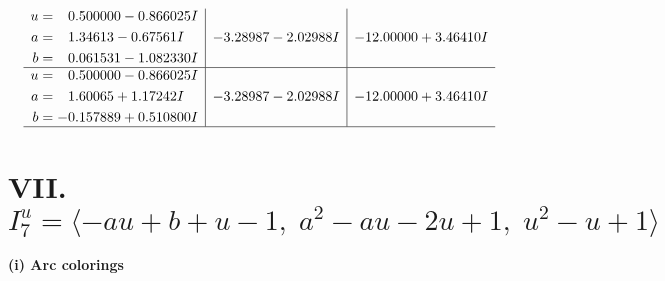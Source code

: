 \documentclass[1p]{elsarticle_modified}
\theoremstyle{definition}
\begin{document}
$$\begin{array}{c|c|c}
\begin{aligned}
u &= \phantom{-}0.500000 - 0.866025 I \\
a &= \phantom{-}1.34613 - 0.67561 I \\
b &= \phantom{-}0.061531 - 1.082330 I\end{aligned}
 & -3.28987 - 2.02988 I & -12.00000 + 3.46410 I \\ \hline\begin{aligned}
u &= \phantom{-}0.500000 - 0.866025 I \\
a &= \phantom{-}1.60065 + 1.17242 I \\
b &= -0.157889 + 0.510800 I\end{aligned}
 & -3.28987 - 2.02988 I & -12.00000 + 3.46410 I\\
 \hline 
 \end{array}$$\newpage\newpage\renewcommand{\arraystretch}{1}
\centering \section*{VII. $I^u_{7}= \langle - a u+b+u-1,\;a^2- a u-2 u+1,\;u^2- u+1 \rangle$}
\flushleft \textbf{(i) Arc colorings}\\
\end{document}
